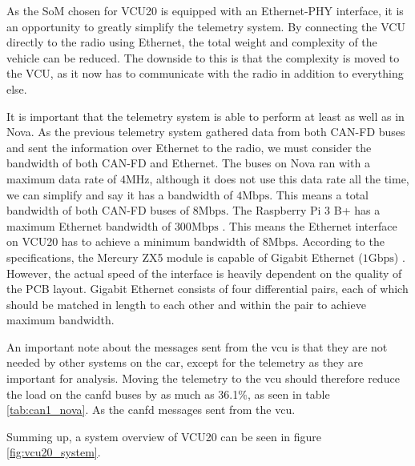 As the SoM chosen for VCU20 is equipped with an Ethernet-PHY interface, it is an opportunity to greatly simplify the telemetry system. By connecting the VCU directly to the radio using Ethernet, the total weight and complexity of the vehicle can be reduced. The downside to this is that the complexity is moved to the VCU, as it now has to communicate with the radio in addition to everything else. 

It is important that the telemetry system is able to perform at least as well as in Nova. As the previous telemetry system gathered data from both CAN-FD buses and sent the information over Ethernet to the radio, we must consider the bandwidth of both CAN-FD and Ethernet. The buses on Nova ran with a maximum data rate of $4\si{\mega\hertz}$, although it does not use this data rate all the time, we can simplify and say it has a bandwidth of $4\textrm{Mbps}$. This means a total bandwidth of both CAN-FD buses of $8\textrm{Mbps}$. The Raspberry Pi 3 B+ has a maximum Ethernet bandwidth of $300\textrm{Mbps}$ \cite{rpi}. This means the Ethernet interface on VCU20 has to achieve a minimum bandwidth of $8\textrm{Mbps}$. According to the specifications, the Mercury ZX5 module is capable of Gigabit Ethernet ($1 \textrm{Gbps}$) \cite{zx5}. However, the actual speed of the interface is heavily dependent on the quality of the PCB layout. Gigabit Ethernet consists of four differential pairs, each of which should be matched in length to each other and within the pair to achieve maximum bandwidth.

An important note about the messages sent from the \acrshort{vcu} is that they are not needed by other systems on the car, except for the telemetry as they are important for analysis. Moving the telemetry to the \acrshort{vcu} should therefore reduce the load on the \acrshort{canfd} buses by as much as 36.1\%, as seen in table \ref{tab:can1_nova}. 
As the \acrshort{canfd} messages sent from the \acrshort{vcu}.

Summing up, a system overview of VCU20 can be seen in figure \ref{fig:vcu20_system}.

